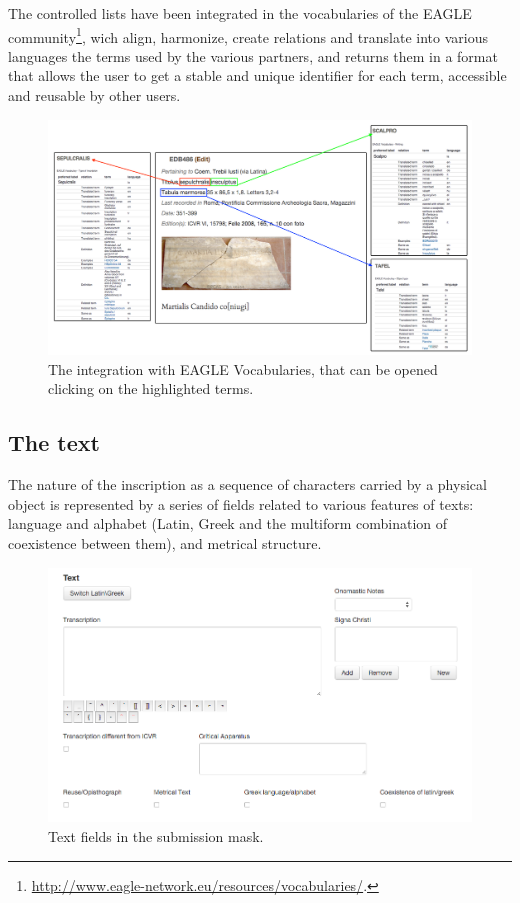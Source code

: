 \documentclass[amsthm,ebook]{saparticle}
\begin{document}
The controlled lists have been integrated in the vocabularies of the EAGLE community\footnote{
\url{http://www.eagle-network.eu/resources/vocabularies/}.}, wich align, harmonize, create relations and translate into
various languages the terms used by the various partners, and returns them in a format that allows the user to get a
stable and unique identifier for each term, accessible and reusable by other users.

\begin{figure}[hbp]
\centering
 \includegraphics[width=\columnwidth]{EAGLE2016Roccoengrev-img009.png}
\caption{The integration with EAGLE Vocabularies, that can be opened clicking on the highlighted terms.}
\label{fig:9}
\end{figure}




\subsection{The text}


The nature of the inscription as a sequence of characters carried by a physical object is represented by a series of
fields related to various features of texts: language and alphabet (Latin, Greek and the multiform combination of
coexistence between them), and metrical structure.




\begin{figure}[hbp]
\centering
 \includegraphics[width=\columnwidth]{EAGLE2016Roccoengrev-img010.png}
\caption{Text fields in the submission mask.}
\label{fig:10}
\end{figure}
\end{document}
